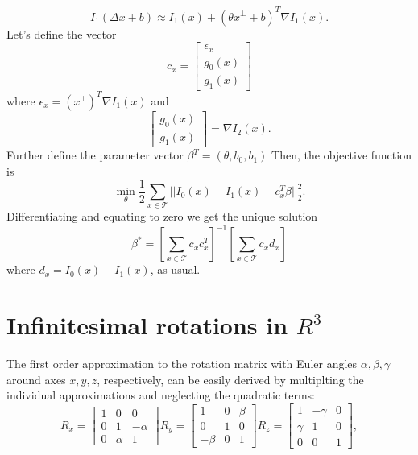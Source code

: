 \documentclass[11pt]{article}
\begin{document}
\begin{equation}
	I_{1}(\Delta x + b) \approx I_{1}(x) + (\theta x^{\perp} + b)^{T}\nabla I_{1}(x).
\end{equation}
Let's define the vector
\begin{equation}
	c_x = \left[\begin{array}{c}\epsilon_{x} \\ g_{0}(x) \\ g_{1}(x)\end{array}\right]
\end{equation}
 where $\epsilon_{x} = (x^{\perp})^{T}\nabla I_{1}(x)$ and
\begin{equation}
	\left[\begin{array}{c}g_{0}(x) \\ g_{1}(x)\end{array}\right]=\nabla I_{2}(x).
\end{equation}
Further define the parameter vector $\beta^{T} = (\theta, b_{0}, b_{1}) $ Then, the objective function is
\begin{equation}
	\min_{\theta} \frac{1}{2}\sum_{x\in\mathcal{T}} ||I_0(x) - I_1(x) - c_{x}^{T}\beta||_{2}^{2}.
\end{equation}
Differentiating and equating to zero we get the unique solution
\begin{equation}
	\beta^{*} =\left[ \sum_{x\in \mathcal{T}} c_{x}c_{x}^{T} \right]^{-1}\left[\sum_{x \in \mathcal{T}}c_{x}d_{x}\right]
\end{equation}
where $d_{x} = I_{0}(x) - I_{1}(x)$, as usual.

\section{Infinitesimal rotations in $R^{3}$}
	The first order approximation to the rotation matrix with Euler angles $\alpha, \beta,\gamma$ around axes $x, y, z$, respectively, can be easily derived by multiplting the individual approximations and neglecting the quadratic terms:
\begin{equation}
	R_{x}=\left[\begin{array}{ccc}1 & 0 & 0\\ 0 & 1 & -\alpha \\ 0 & \alpha & 1\end{array}\right]
	R_{y}=\left[\begin{array}{ccc}1 & 0 & \beta\\ 0 & 1 & 0 \\ -\beta & 0 & 1\end{array}\right]
	R_{z}=\left[\begin{array}{ccc}1 & -\gamma & 0\\ \gamma & 1 & 0 \\ 0 & 0 & 1\end{array}\right],
\end{equation}
	
\end{document}
